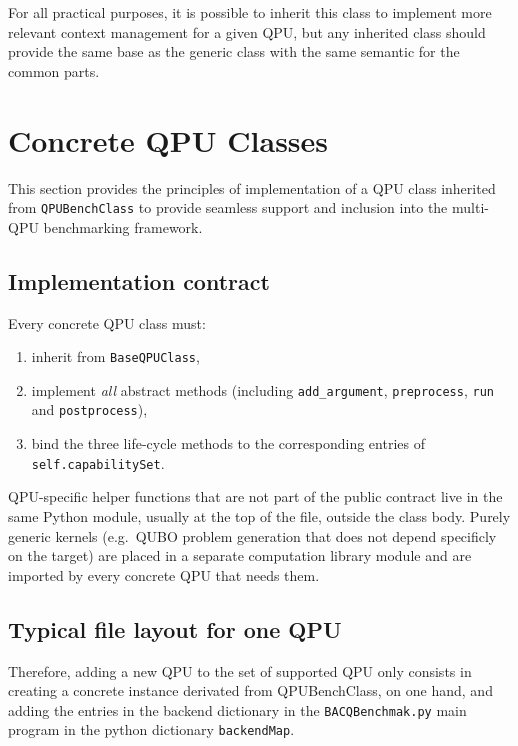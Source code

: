 For all practical purposes, it is possible to inherit this class to implement more relevant context management for a given QPU, but any inherited class should provide the same base as the generic class with the same semantic for the common parts.

\section{Concrete QPU Classes}\label{sec:concreteQPU}

This section provides the principles of implementation of a QPU class inherited from \texttt{QPUBenchClass} to provide seamless support and inclusion into the multi-QPU benchmarking framework.

\subsection{Implementation contract}

Every concrete QPU class must:

\begin{enumerate}
  \item inherit from \texttt{BaseQPUClass},
  \item implement \emph{all} abstract methods (including \texttt{add\_argument}, \texttt{preprocess}, \texttt{run} and \texttt{postprocess}),
  \item bind the three life-cycle methods to the corresponding entries of \texttt{self.capabilitySet}.
\end{enumerate}

QPU-specific helper functions that are not part of the public contract live in the same Python module, usually at the top of the file, outside the class body.  Purely generic kernels (e.g.\ QUBO problem generation that does not depend specificly on the target) are placed in a separate computation library module and are imported by every concrete QPU that needs them.

\subsection{Typical file layout for one QPU}

Therefore, adding a new QPU to the set of supported QPU only consists in creating a concrete instance derivated from QPUBenchClass, on one hand, and adding the entries in the backend dictionary in the \texttt{BACQBenchmak.py} main program in the python dictionary \texttt{backendMap}.

